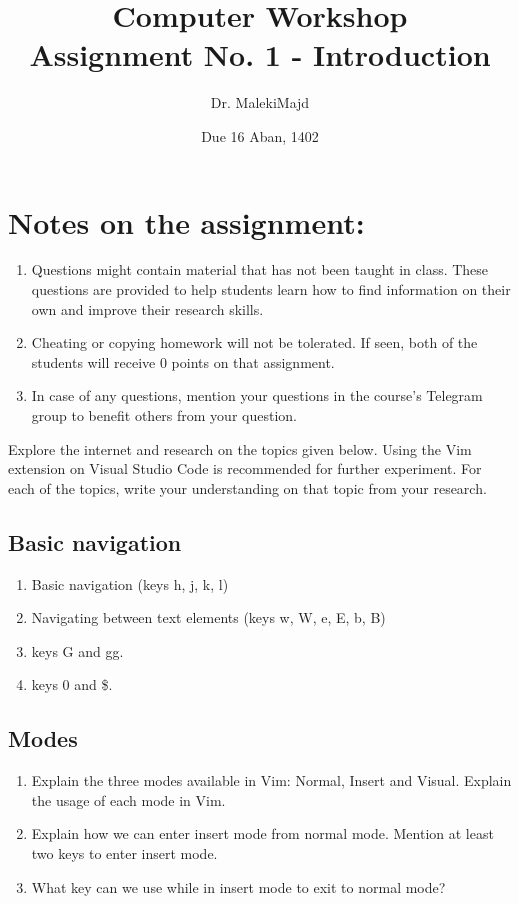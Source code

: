 \documentclass[titlepage]{article}
\title{Computer Workshop\\Assignment No. 1 - Introduction}
\author{Dr. MalekiMajd}
\date{Due 16 Aban, 1402}
\begin{document}
\maketitle

\section*{Notes on the assignment:}
\begin{enumerate}
        \item Questions might contain material that has not been taught in class.
        These questions are provided to help students learn how to find
        information on their own and improve their research skills.
    \item Cheating or copying homework will not be tolerated. If seen, both of
        the students will receive 0 points on that assignment.
    \item In case of any questions, mention your questions in the course's Telegram
        group to benefit others from your question.
\end{enumerate}

\pagebreak

Explore the internet and research on the topics given below. Using the Vim extension
on Visual Studio Code is recommended for further experiment. For each of the topics,
write your understanding on that topic from your research.

\subsection{Basic navigation}
\begin{enumerate}
    \item Basic navigation (keys h, j, k, l)
    \item Navigating between text elements (keys w, W, e, E, b, B)
    \item keys G and gg.
    \item keys 0 and \$.
\end{enumerate}

\subsection{Modes}
\begin{enumerate}
    \item Explain the three modes available in Vim: Normal, Insert and Visual.
        Explain the usage of each mode in Vim.
    \item Explain how we can enter insert mode from normal mode. Mention at least
        two keys to enter insert mode.
    \item What key can we use while in insert mode to exit to normal mode?
\end{enumerate}
\end{document}
